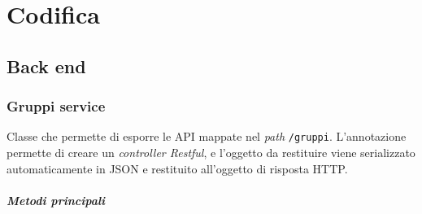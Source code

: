 \section{Codifica}
\subsection{Back end}
\subsubsection{Gruppi service}
Classe che permette di esporre le \gls{API} mappate nel \textit{path} \texttt{/gruppi}. 
L'annotazione  permette di creare un \textit{controller Restful}, e l'oggetto da restituire viene serializzato automaticamente in JSON e restituito all'oggetto di risposta HTTP.
\subparagraph*{Metodi principali}
